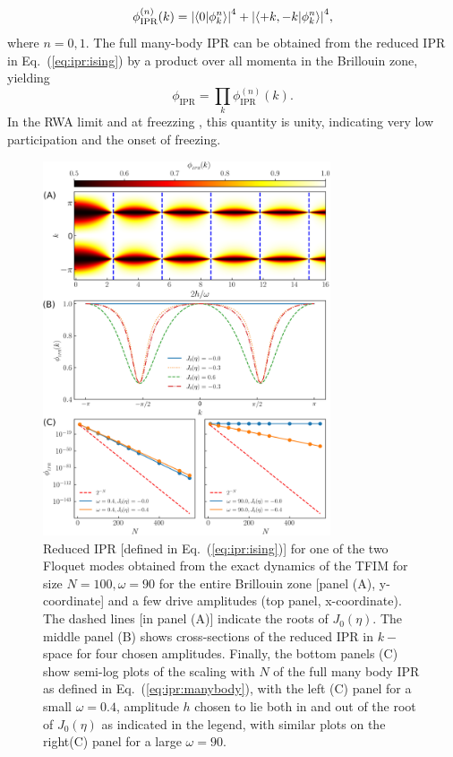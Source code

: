 \documentclass[%
reprint,
superscriptaddress,
amsmath,amssymb,
aps,
prb,
showkeys,
]{revtex4-2}
\begin{document}
\begin{equation}
	\label{eq:ipr:ising}
	\phi^{(n)}_\mathrm{IPR}(k) = \abs{\ip{0}{\phi^n_k}}^4 + \abs{\ip{ +k, -k }{\phi^n_k}}^4,
\end{equation}
where $n=0,1$. The full many-body IPR can be obtained from the reduced IPR in Eq.~(\ref{eq:ipr:ising}) by a product over all momenta in the Brillouin zone, yielding
\begin{equation}
	\label{eq:ipr:manybody}
	\phi_\mathrm{IPR} = \prod_k \phi^{(n)}_\mathrm{IPR}(k).
\end{equation}
In the RWA limit and at freezzing , this quantity is unity, indicating very low participation and the onset of freezing.
\begin{figure}[t!]
	\centering
	\includegraphics[width = 8.5cm]{figure_2.jpeg}
	\caption{Reduced IPR [defined in Eq.~(\ref{eq:ipr:ising})] {for one of the two Floquet modes obtained from the exact dynamics of the TFIM for size} $N = 100, \omega=90$ {for the entire Brillouin zone [panel (A), y-coordinate] and a few drive amplitudes (top panel, x-coordinate). The dashed lines [in panel (A)] indicate the roots of} $J_0(\eta)${. The middle panel (B) shows cross-sections of the reduced IPR in} $k-$ {space for four chosen amplitudes. Finally, the bottom panels (C) show semi-log plots of the scaling with} $N$ of the full many body IPR as defined in Eq.~(\ref{eq:ipr:manybody}), with the left (C) panel for a small $\omega=0.4$, amplitude $h$ chosen to lie both in and out of the root of $J_0(\eta)$ {as indicated in the legend, with similar plots on the right(C) panel for a large} $\omega=90$. }
	\label{fig:ipr:tfim}
\end{figure}
\end{document}
